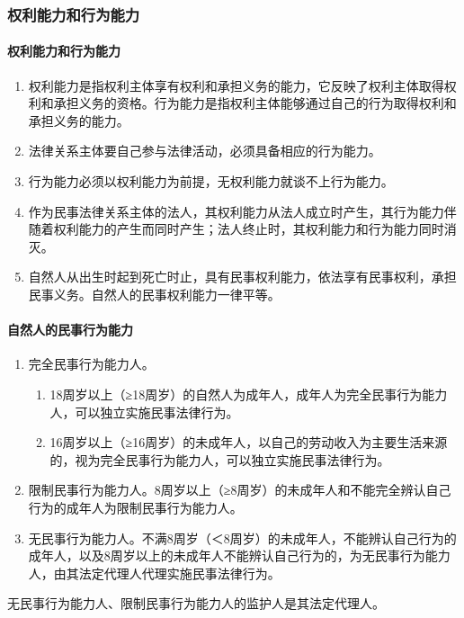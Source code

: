 \documentclass[UTF8,12pt]{ctexart}
\numberwithin{equation}{section} %
\numberwithin{figure}{section}
\numberwithin{table}{section}
\begin{document}
	\subsubsection{权利能力和行为能力}
	\paragraph{权利能力和行为能力}
	\begin{enumerate}
		\item 权利能力是指权利主体享有权利和承担义务的能力，它反映了权利主体取得权利和承担义务的资格。行为能力是指权利主体能够通过自己的行为取得权利和承担义务的能力。
		
		\item 法律关系主体要自己参与法律活动，必须具备相应的行为能力。
		
		\item 行为能力必须以权利能力为前提，无权利能力就谈不上行为能力。
		
		\item 作为民事法律关系主体的法人，其权利能力从法人成立时产生，其行为能力伴随着权利能力的产生而同时产生；法人终止时，其权利能力和行为能力同时消灭。
		
		\item 自然人从出生时起到死亡时止，具有民事权利能力，依法享有民事权利，承担民事义务。自然人的民事权利能力一律平等。
	\end{enumerate}
	
	
	\paragraph{自然人的民事行为能力}
	\begin{enumerate}
		\item 完全民事行为能力人。
		\begin{enumerate}
			\item 18周岁以上（≥18周岁）的自然人为成年人，成年人为完全民事行为能力人，可以独立实施民事法律行为。
			
			\item 16周岁以上（≥16周岁）的未成年人，以自己的劳动收入为主要生活来源的，视为完全民事行为能力人，可以独立实施民事法律行为。
		\end{enumerate}
		
		\item 限制民事行为能力人。8周岁以上（≥8周岁）的未成年人和不能完全辨认自己行为的成年人为限制民事行为能力人。
		
		\item 无民事行为能力人。不满8周岁（＜8周岁）的未成年人，不能辨认自己行为的成年人，以及8周岁以上的未成年人不能辨认自己行为的，为无民事行为能力人，由其法定代理人代理实施民事法律行为。
	\end{enumerate}
	无民事行为能力人、限制民事行为能力人的监护人是其法定代理人。
	
\end{document}
